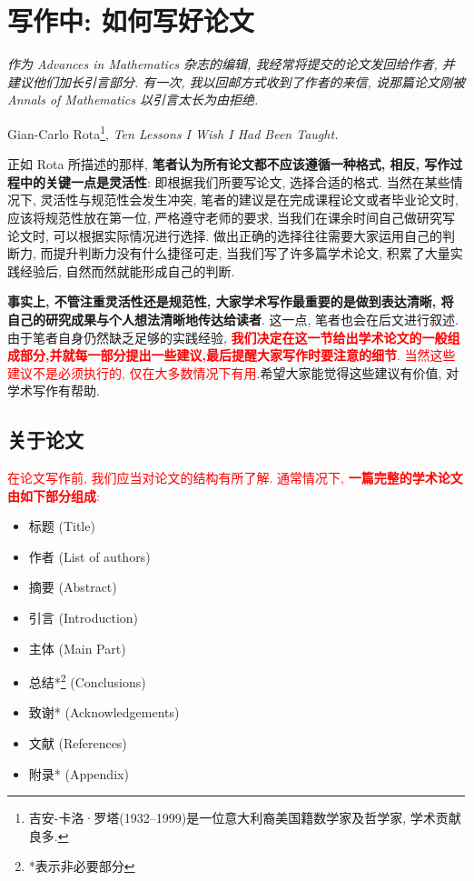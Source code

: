 \documentclass{formatBook}
\newcommand{\XG}[1]{\textcolor{red}{#1}}
\begin{document}
\section{写作中: 如何写好论文}
\noindent \textit{作为 Advances in Mathematics 杂志的编辑, 我经常将提交的论文发回给作者, 并建议他们加长引言部分. 有一次, 我以回邮方式收到了作者的来信, 说那篇论文刚被 Annals of Mathematics 以引言太长为由拒绝. }
\begin{flushright}
    \cndash Gian-Carlo Rota\footnote{吉安-卡洛·罗塔(1932–1999)是一位意大利裔美国籍数学家及哲学家, 学术贡献良多.}, \textit{Ten Lessons I Wish I Had Been Taught\cite{RotaTen1997}.}
\end{flushright}

正如 Rota 所描述的那样, \textbf{笔者认为所有论文都不应该遵循一种格式, 相反, 写作过程中的关键一点是灵活性}: 即根据我们所要写论文, 选择合适的格式.
当然在某些情况下, 灵活性与规范性会发生冲突, 笔者的建议是在完成课程论文或者毕业论文时, 应该将规范性放在第一位{,} 严格遵守老师的要求, 当我们在课余时间自己做研究写论文时, 可以根据实际情况进行选择.
做出正确的选择往往需要大家运用自己的判断力, 而提升判断力没有什么捷径可走, 当我们写了许多篇学术论文, 积累了大量实践经验后, 自然而然就能形成自己的判断.

\textbf{事实上, 不管注重灵活性还是规范性, 大家学术写作最重要的是做到表达清晰, 将自己的研究成果与个人想法清晰地传达给读者}. 这一点, 笔者也会在后文进行叙述.
由于笔者自身仍然缺乏足够的实践经验, \XG{\textbf{我们决定在这一节给出学术论文的一般组成部分,并就每一部分提出一些建议,最后提醒大家写作时要注意的细节}. 当然这些建议不是必须执行的, 仅在大多数情况下有用}.希望大家能觉得这些建议有价值, 对学术写作有帮助.
\subsection{关于论文}
\XG{在论文写作前, 我们应当对论文的结构有所了解. 通常情况下, \textbf{一篇完整的学术论文由如下部分组成}:}
\begin{itemize}
    \item 标题 (Title)
    \item 作者 (List of authors)
    \item 摘要 (Abstract)
    \item 引言 (Introduction)
    \item 主体 (Main Part)
    \item 总结*\footnote{*表示非必要部分} (Conclusions)
    \item 致谢* (Acknowledgements)
    \item 文献 (References)
    \item 附录* (Appendix)
\end{itemize}
\end{document}
